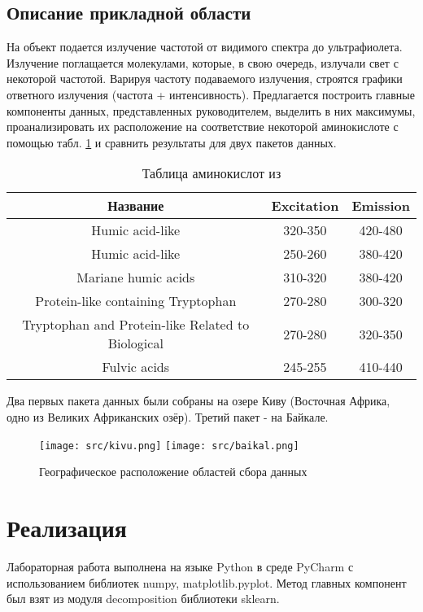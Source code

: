 \documentclass[a4paper]{article}
\begin{document}
\subsection{Описание прикладной области}
На объект подается излучение частотой от видимого спектра до ультрафиолета. Излучение поглащается молекулами, которые, в свою очередь, излучали свет с некоторой частотой. Варируя частоту подаваемого излучения, строятся графики ответного излучения (частота + интенсивность). Предлагается построить главные компоненты данных, представленных руководителем, выделить в них максимумы, проанализировать их расположение на соответствие некоторой аминокислоте с помощью табл. \ref{tab:amino} и сравнить результаты для двух пакетов данных.
\begin{table}[H]
    \centering
    \begin{tabular}{|c|c|c|}
        \hline
         Название&Excitation&Emission  \\
         \hline
         Humic acid-like&320-350&420-480\\
         \hline
         Humic acid-like&250-260&380-420\\
         \hline
         Mariane humic acids&310-320&380-420\\
         \hline
         Protein-like containing Tryptophan&270-280&300-320\\
         \hline
         Tryptophan and Protein-like Related to Biological&270-280&320-350\\
         \hline
         Fulvic acids&245-255&410-440\\
         \hline
    \end{tabular}
    \caption{Таблица аминокислот из \cite{article1}}
    \label{tab:amino}
\end{table}
Два первых пакета данных были собраны на озере Киву (Восточная Африка, одно из Великих Африканских озёр). Третий пакет - на Байкале.
\begin{figure}[H]
    \centering
    \texttt{[image: src/kivu.png]}
    \texttt{[image: src/baikal.png]}
    \caption{Географическое расположение областей сбора данных}
    \label{fig:kivu}
\end{figure}
\section{Реализация}
Лабораторная работа выполнена на языке Python в среде PyCharm с использованием библиотек numpy, matplotlib.pyplot. Метод главных компонент был взят из модуля decomposition библиотеки sklearn.
\end{document}
